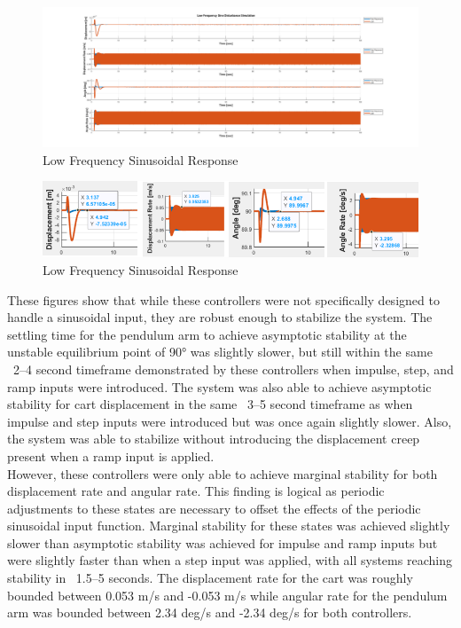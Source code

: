 \documentclass[titlepage]{article}
\begin{document}
\begin{figure}[h]
    \includegraphics[width=1\linewidth]{low_frequency_sine.png}
    \caption{Low Frequency Sinusoidal Response}
    \label{fig:enter-label}
\end{figure}

\begin{figure}[h]
    \includegraphics[width=1\linewidth]{eddie_fig_1.png}
    \caption{Low Frequency Sinusoidal Response}
    \label{fig:enter-label}
\end{figure}

These figures show that while these controllers were not specifically designed to handle a sinusoidal input, they are robust enough to stabilize the system. The settling time for the pendulum arm to achieve asymptotic stability at the unstable equilibrium point of 90° was slightly slower, but still within the same ~2–4 second timeframe demonstrated by these controllers when impulse, step, and ramp inputs were introduced. The system was also able to achieve asymptotic stability for cart displacement in the same ~3–5 second timeframe as when impulse and step inputs were introduced but was once again slightly slower. Also, the system was able to stabilize without introducing the displacement creep present when a ramp input is applied.\\

However, these controllers were only able to achieve marginal stability for both displacement rate and angular rate. This finding is logical as periodic adjustments to these states are necessary to offset the effects of the periodic sinusoidal input function.  Marginal stability for these states was achieved slightly slower than asymptotic stability was achieved for impulse and ramp inputs but were slightly faster than when a step input was applied, with all systems reaching stability in ~1.5–5 seconds. The displacement rate for the cart was roughly bounded between 0.053 m/s and -0.053 m/s while angular rate for the pendulum arm was bounded between 2.34 deg/s and -2.34 deg/s for both controllers.\\
\end{document}
